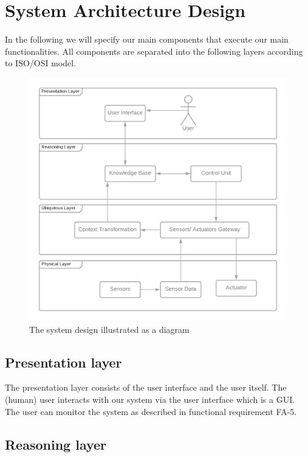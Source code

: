 \section{System Architecture Design}\label{sec:system-architecture-design}

In the following we will specify our main components that execute our main functionalities.
All components are separated into the following layers according to ISO/OSI model.

\begin{figure}
    \centering
    \includegraphics[width=\linewidth]{img/system-design.png}
    \caption{The system design illustrated as a diagram}
    \label{fig:system-design}
\end{figure}

\subsection{Presentation layer}\label{subsec:presentation-layer}
The presentation layer consists of the user interface and the user itself.
The (human) user interacts with our system via the user interface which is a GUI. The user can monitor the system as described in functional requirement FA-5.

\subsection{Reasoning layer}\label{subsec:reasoning-layer}

